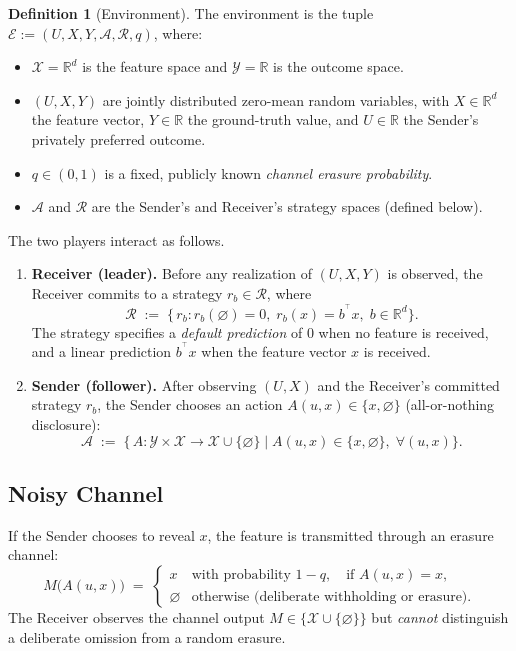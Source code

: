 \documentclass[11pt]{article}
\theoremstyle{definition}
\newtheorem{definition}[theorem]{Definition}
\theoremstyle{remark}
\newcommand{\R}{\mathbb{R}}
\newcommand{\T}{^{\top}}
\begin{document}
\begin{definition}[Environment]
  The environment is the tuple $\mathcal{E} := (U, X, Y, \mathcal{A}, \mathcal{R}, q)$,
  where:
  \begin{itemize}
    \item $\mathcal{X} = \R^{d}$ is the feature space and $\mathcal{Y} = \R$ is the
          outcome space.
    \item $(U, X, Y)$ are jointly distributed zero-mean random variables, with
          $X \in \R^{d}$ the feature vector, $Y \in \R$ the ground-truth value, and
          $U \in \R$ the Sender's privately preferred outcome.
    \item $q \in (0,1)$ is a fixed, publicly known \emph{channel erasure probability}.
    \item $\mathcal{A}$ and $\mathcal{R}$ are the Sender's and Receiver's strategy spaces
          (defined below).
  \end{itemize}
\end{definition}

The two players interact as follows.
\begin{enumerate}[label=\textbf{P\arabic*.}]
  \item \textbf{Receiver (leader).}  Before any realization of $(U,X,Y)$ is observed,
        the Receiver commits to a strategy
        $r_{b} \in \mathcal{R}$, where
        \[
          \mathcal{R}
          \;:=\;
          \bigl\{\,r_{b} : r_{b}(\varnothing) = 0,\; r_{b}(x) = b^{\T}x,\; b \in \R^{d}\bigr\}.
        \]
        The strategy specifies a \emph{default prediction} of $0$ when no feature is
        received, and a linear prediction $b^{\T}x$ when the feature vector $x$ is received.
  \item \textbf{Sender (follower).}  After observing $(U,X)$ and the Receiver's committed
        strategy $r_{b}$, the Sender chooses an action
        $A(u,x) \in \{x,\varnothing\}$ (all-or-nothing disclosure):
        \[
          \mathcal{A}
          \;:=\;
          \bigl\{\,A : \mathcal{Y}\times\mathcal{X} \to \mathcal{X}\cup\{\varnothing\}
                 \;\big|\;
                 A(u,x) \in \{x,\varnothing\},\; \forall (u,x)\bigr\}.
        \]
\end{enumerate}

\subsection{Noisy Channel}

If the Sender chooses to reveal $x$, the feature is transmitted through an erasure channel:
\[
  M\bigl(A(u,x)\bigr)
  \;=\;
  \begin{cases}
    x & \text{with probability } 1-q, \quad \text{if } A(u,x)=x, \\
    \varnothing & \text{otherwise (deliberate withholding or erasure).}
  \end{cases}
\]
The Receiver observes the channel output $M \in \{\mathcal{X} \cup \{\varnothing\}\}$ but
\emph{cannot} distinguish a deliberate omission from a random erasure.
\end{document}
